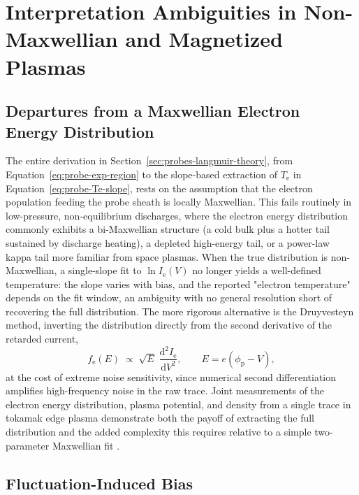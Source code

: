 \section{Interpretation Ambiguities in Non-Maxwellian and Magnetized Plasmas}
\label{sec:probes-ambiguities}

\subsection{Departures from a Maxwellian Electron Energy Distribution}

The entire derivation in Section~\ref{sec:probes-langmuir-theory}, from Equation~\eqref{eq:probe-exp-region} to the slope-based extraction of $T_{\mathrm{e}}$ in Equation~\eqref{eq:probe-Te-slope}, rests on the assumption that the electron population feeding the probe sheath is locally Maxwellian. This fails routinely in low-pressure, non-equilibrium discharges, where the electron energy distribution commonly exhibits a bi-Maxwellian structure (a cold bulk plus a hotter tail sustained by discharge heating), a depleted high-energy tail, or a power-law kappa tail more familiar from space plasmas. When the true distribution is non-Maxwellian, a single-slope fit to $\ln I_{\mathrm{e}}(V)$ no longer yields a well-defined temperature: the slope varies with bias, and the reported "electron temperature" depends on the fit window, an ambiguity with no general resolution short of recovering the full distribution. The more rigorous alternative is the Druyvesteyn method, inverting the distribution directly from the second derivative of the retarded current,
\begin{equation}
f_{\mathrm{e}}(E) \;\propto\; \sqrt{E}\; \frac{\mathrm{d}^2 I_{\mathrm{e}}}{\mathrm{d}V^2}, \qquad E = e\left(\phi_{\mathrm{p}} - V\right),
\label{eq:druyvesteyn}
\end{equation}
at the cost of extreme noise sensitivity, since numerical second differentiation amplifies high-frequency noise in the raw trace. Joint measurements of the electron energy distribution, plasma potential, and density from a single trace in tokamak edge plasma demonstrate both the payoff of extracting the full distribution and the added complexity this requires relative to a simple two-parameter Maxwellian fit \cite{ref0213}.

\subsection{Fluctuation-Induced Bias}

